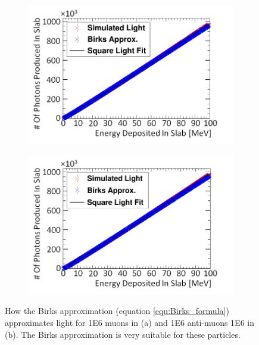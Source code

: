 \begin{figure}[htbp]
\centering
\begin{subfigure}{.5\textwidth}
  \centering
  \includegraphics[width=\linewidth]{Appendix5/newNewFigs/mu-BirksSlab_simAndApproxLight.png}
  \captionsetup{width=.9\linewidth}
  \caption{}
  \label{subfig:append5_light_of_muons0-100mev}
\end{subfigure}%
\begin{subfigure}{.5\textwidth}
  \centering
  \includegraphics[width=\linewidth]{Appendix5/newNewFigs/mu+BirksSlab_simAndApproxLight.png}
  \captionsetup{width=.9\linewidth}
  \caption{}
  \label{subfig:append5_light_of_Amuons0-100mev}
\end{subfigure}
\caption[Birks' light approximation for muon particles compared to simulation.]{How the Birks approximation (equation \ref{equ:Birks_formula}) approximates light for 1E6 muons in (a) and 1E6 anti-muons 1E6 in (b). The Birks approximation is very suitable for these particles.}
\label{fig:append5_light_of_muons_Amuons0-100mev}
\end{figure}

